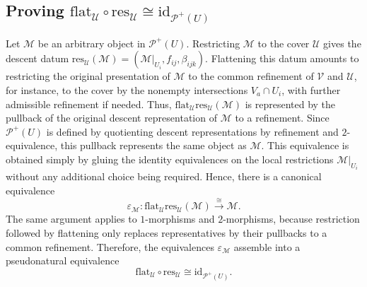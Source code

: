 \documentclass[reqno]{amsart}
\theoremstyle{definition}
\theoremstyle{remark}
\begin{document}
\subsection{Proving $ \text{flat}_{\mathcal{U}}\circ \text{res}_{\mathcal{U}}
\cong \text{id}_{\mathscr{P}^+(U)}$}
Let $\mathcal{M}$ be an arbitrary object in $\mathscr{P}^+(U)$. Restricting $\mathcal{M}$ to the cover $\mathcal{U}$ gives the descent datum $\text{res}_\mathcal{U}(\mathcal{M})=(\mathcal{M}|_{U_i},f_{ij},\beta_{ijk})$. Flattening this datum amounts to restricting the original presentation of $\mathcal{M}$ to the common refinement of $\mathcal{V}$ and $\mathcal{U}$, for instance, to the cover by the nonempty intersections $V_a\cap U_i$, with further admissible refinement if needed. Thus, $\text{flat}_{\mathcal{U}}\text{res}_{\mathcal{U}}(\mathcal{M})$ is represented by the pullback of the original descent representation of $\mathcal{M}$ to a refinement. Since $\mathscr{P}^+(U)$ is defined by quotienting descent representations by refinement and $2$-equivalence, this pullback represents the same object as $\mathcal{M}$. This equivalence is obtained simply by gluing the identity equivalences on the local restrictions $\mathcal{M}|_{U_i}$ without any additional choice being required. Hence, there is a canonical equivalence
\begin{equation}
\varepsilon_{\mathcal{M}}:
\text{flat}_{\mathcal{U}}\text{res}_{\mathcal{U}}(\mathcal{M})
\mathop{\longrightarrow}\limits^{\cong}
\mathcal{M}.
\end{equation}
The same argument applies to $1$-morphisms and $2$-morphisms, because restriction followed by flattening only replaces representatives by their pullbacks to a common refinement. Therefore, the equivalences $\varepsilon_{\mathcal{M}}$ assemble into a pseudonatural equivalence
\begin{equation}
\text{flat}_{\mathcal{U}}\circ \text{res}_{\mathcal{U}}
\cong
\text{id}_{\mathscr{P}^+(U)}.
\end{equation}
\end{document}
